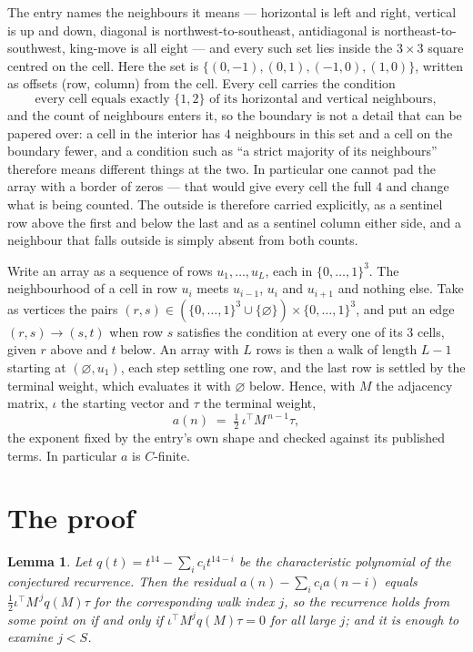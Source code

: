 \documentclass[11pt,a4paper]{article}
\theoremstyle{plain}
\newtheorem{lemma}[theorem]{Lemma}
\theoremstyle{definition}
\begin{document}
The entry names the neighbours it means --- horizontal is left and right, vertical is up and
down, diagonal is northwest-to-southeast, antidiagonal is northeast-to-southwest, king-move is
all eight --- and every such set lies inside the $3\times3$ square centred on the cell. Here
the set is $\{(0,-1), (0,1), (-1,0), (1,0)\}$, written as offsets (row, column) from the cell. Every cell carries
the condition
\[
\text{every cell equals exactly }\{1,2\}\text{ of its horizontal and vertical neighbours},
\]
and the count of neighbours enters it, so the boundary is not a detail that can be papered
over: a cell in the interior has $4$ neighbours in this set and a cell on the boundary
fewer, and a condition such as ``a strict majority of its neighbours'' therefore means
different things at the two. In particular one cannot pad the array with a border of zeros ---
that would give every cell the full $4$ and change what is being counted. The outside is
therefore carried
explicitly, as a sentinel row above the first and below the last and as a sentinel column
either side, and a neighbour that falls outside is simply absent from both counts.

Write an array as a sequence of rows $u_1,\dots,u_L$, each in
$\{0,\dots,1\}^{3}$. The neighbourhood of a cell in row $u_i$ meets $u_{i-1}$,
$u_i$ and $u_{i+1}$ and nothing else. Take as vertices the pairs
$(r,s)\in(\{0,\dots,1\}^{3}\cup\{\varnothing\})\times\{0,\dots,1\}^{3}$,
and put an edge $(r,s)\to(s,t)$ when row $s$ satisfies the condition at every one of its
$3$ cells, given $r$ above and $t$ below. An array with $L$ rows is then a walk of length
$L-1$ starting at $(\varnothing,u_1)$, each step settling one row, and the last row is
settled by the terminal weight, which evaluates it with $\varnothing$ below. Hence,
with $M$ the adjacency matrix, $\iota$ the starting vector and $\tau$ the terminal weight,
\[
a(n)\;=\;\tfrac1{2}\,\iota^{\!\top}M^{\,n-1}\tau ,
\]
the exponent fixed by the entry's own shape and checked against its published terms. In
particular $a$ is $C$-finite.

\section{The proof}

\begin{lemma}\label{lem:crit}
Let $q(t)=t^{14}-\sum_i c_it^{14-i}$ be the characteristic polynomial of the
conjectured recurrence. Then the residual $a(n)-\sum_ic_ia(n-i)$ equals
$\tfrac1{2}\iota^{\!\top}M^{\,j}q(M)\tau$ for the corresponding walk index $j$, so the
recurrence holds from some point on if and only if $\iota^{\!\top}M^{j}q(M)\tau=0$ for all
large $j$; and it is enough to examine $j<S$.
\end{lemma}
\end{document}
